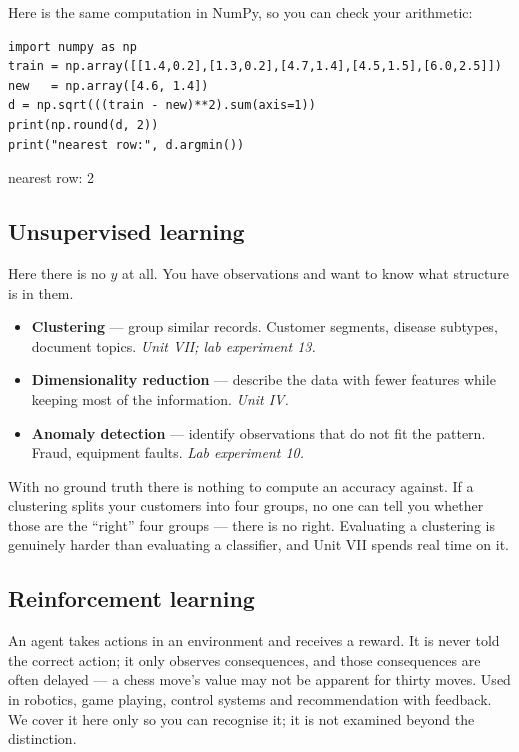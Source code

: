 \documentclass[11pt]{article}
\begin{document}
Here is the same computation in NumPy, so you can check your arithmetic:

\begin{lstlisting}
import numpy as np
train = np.array([[1.4,0.2],[1.3,0.2],[4.7,1.4],[4.5,1.5],[6.0,2.5]])
new   = np.array([4.6, 1.4])
d = np.sqrt(((train - new)**2).sum(axis=1))
print(np.round(d, 2))
print("nearest row:", d.argmin())
\end{lstlisting}
\begin{codeout}
[3.42 3.51 0.1  0.14 1.78]
nearest row: 2
\end{codeout}

\subsection{Unsupervised learning}

Here there is no $y$ at all. You have observations and want to know what
structure is in them.

\begin{itemize}[leftmargin=*]
  \item \textbf{Clustering} --- group similar records. Customer segments,
    disease subtypes, document topics. \emph{Unit VII; lab experiment 13.}
  \item \textbf{Dimensionality reduction} --- describe the data with fewer
    features while keeping most of the information. \emph{Unit IV.}
  \item \textbf{Anomaly detection} --- identify observations that do not fit the
    pattern. Fraud, equipment faults. \emph{Lab experiment 10.}
\end{itemize}

\begin{caution}
With no ground truth there is nothing to compute an accuracy against. If a
clustering splits your customers into four groups, no one can tell you whether
those are the ``right'' four groups --- there is no right. Evaluating a
clustering is genuinely harder than evaluating a classifier, and Unit VII spends
real time on it.
\end{caution}

\subsection{Reinforcement learning}

An agent takes actions in an environment and receives a reward. It is never told
the correct action; it only observes consequences, and those consequences are
often delayed --- a chess move's value may not be apparent for thirty moves.
Used in robotics, game playing, control systems and recommendation with
feedback. We cover it here only so you can recognise it; it is not examined
beyond the distinction.
\end{document}
